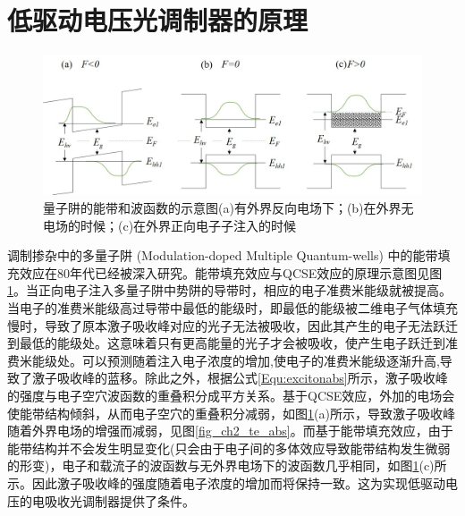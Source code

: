 \section{低驱动电压光调制器的原理}
\begin{figure}[htb]
	\centering
	\includegraphics[width=14cm]{./Pictures/fig_ch4_bandfilling_diag.jpg}
	\caption{ 量子阱的能带和波函数的示意图(a)有外界反向电场下；(b)在外界无电场的时候；(c)在外界正向电子子注入的时候}
	\label{fig_ch4_band_lineup}
\end{figure}
调制掺杂中的多量子阱 (Modulation-doped Multiple Quantum-wells) 中的能带填充效应在80年代已经被深入研究\cite{livescu1988free}。能带填充效应与QCSE效应的原理示意图见图\ref{fig_ch4_band_lineup}。当正向电子注入多量子阱中势阱的导带时，相应的电子准费米能级就被提高。当电子的准费米能级高过导带中最低的能级时，即最低的能级被二维电子气体填充慢时，导致了原本激子吸收峰对应的光子无法被吸收，因此其产生的电子无法跃迁到最低的能级处。这意味着只有更高能量的光子才会被吸收，使产生电子跃迁到准费米能级处。可以预测随着注入电子浓度的增加,使电子的准费米能级逐渐升高,导致了激子吸收峰的蓝移。除此之外，根据公式\ref{Equ:excitonabs}所示，激子吸收峰的强度与电子空穴波函数的重叠积分成平方关系。基于QCSE效应，外加的电场会使能带结构倾斜，从而电子空穴的重叠积分减弱，如图\ref{fig_ch4_band_lineup}(a)所示，导致激子吸收峰随着外界电场的增强而减弱，见图\ref{fig_ch2_te_abs}。而基于能带填充效应，由于能带结构并不会发生明显变化(只会由于电子间的多体效应导致能带结构发生微弱的形变\cite{livescu1988free})，电子和载流子的波函数与无外界电场下的波函数几乎相同，如图\ref{fig_ch4_band_lineup}(c)所示。因此激子吸收峰的强度随着电子浓度的增加而将保持一致。这为实现低驱动电压的电吸收光调制器提供了条件。

